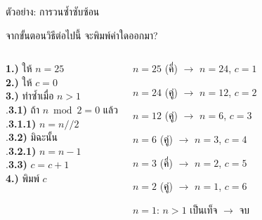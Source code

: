 \documentclass[11pt, aspectratio=169]{beamer}
\begin{document}
\begin{frame}{ตัวอย่าง: การวนซํ้าซับซ้อน}
  \begin{exambox}
    จากขั้นตอนวิธีต่อไปนี้ จะพิมพ์ค่าใดออกมา?
  \end{exambox}

  \begin{columns}[T]
      \begin{pseudobox}
        \textbf{1.)} ให้ $n = 25$ \\
        \textbf{2.)} ให้ $c = 0$ \\
        \textbf{3.)} ทำซํ้าเมื่อ $n > 1$ \\
        .\qquad \textbf{3.1)} ถ้า $n \bmod 2 = 0$ แล้ว \\
        .\qquad\quad \textbf{3.1.1)} $n = n // 2$ \\
        .\qquad \textbf{3.2)} มิฉะนั้น \\
        .\qquad\quad \textbf{3.2.1)} $n = n - 1$ \\
        .\qquad \textbf{3.3)} $c = c + 1$ \\
        \textbf{4.)} พิมพ์ $c$
      \end{pseudobox}
      \begin{solbox}
        $n=25$ (คี่) $\rightarrow$ $n=24$, $c=1$

        $n=24$ (คู่) $\rightarrow$ $n=12$, $c=2$

        $n=12$ (คู่) $\rightarrow$ $n=6$, $c=3$

        $n=6$ (คู่) $\rightarrow$ $n=3$, $c=4$

        $n=3$ (คี่) $\rightarrow$ $n=2$, $c=5$

        $n=2$ (คู่) $\rightarrow$ $n=1$, $c=6$

        $n=1$: $n > 1$ เป็นเท็จ $\rightarrow$ จบ

      \end{solbox}
  \end{columns}
\end{frame}
\end{document}
